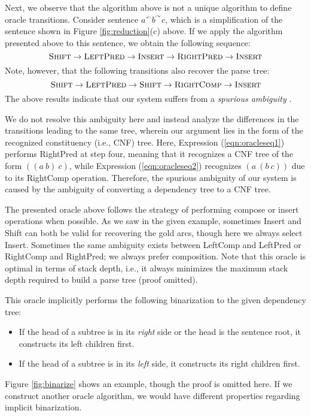 \documentclass[english]{jnlp_1.4}
\begin{document}
Next, we observe that the algorithm above is not a unique algorithm to define oracle transitions.
Consider sentence $a ^\curvearrowleft b ^\curvearrowright c$, 
    which is a simplification of the sentence shown in Figure \ref{fig:reduction}(c) above.
If we apply the algorithm presented above to this sentence, we obtain the following sequence:
\begin{equation}
 \textsc{Shift} \rightarrow \textsc{LeftPred} \rightarrow \textsc{Insert} \rightarrow \textsc{RightPred} \rightarrow \textsc{Insert} \label{eqn:oracleseq1}
\end{equation}
Note, however, that the following transitions also recover the parse tree:
\begin{equation}
 \textsc{Shift} \rightarrow \textsc{LeftPred} \rightarrow \textsc{Shift} \rightarrow \textsc{RightComp} \rightarrow \textsc{Insert} \label{eqn:oracleseq2}
\end{equation}
The above results indicate that our system suffers from a {\it spurious ambiguity} \cite{GoldbergTDP13}.

We do not resolve this ambiguity here and instead analyze the differences in the transitions leading to the same tree, wherein our argument lies in the form of the recognized constituency (i.e., CNF) tree.
Here, Expression (\ref{eqn:oracleseq1}) performs {\sc RightPred} at step four, meaning that it recognizes a CNF tree of the form $((a~b)~c)$, while Expression (\ref{eqn:oracleseq2}) recognizes $(a~(b~c))$ due to its {\sc RightComp} operation. Therefore, the spurious ambiguity of our system is caused by the ambiguity of converting a dependency tree to a CNF tree.

The presented oracle above follows the strategy of performing compose or insert operations when possible.
As we saw in the given example, sometimes {\sc Insert} and {\sc Shift} can both be valid for recovering the gold arcs, though here we always select {\sc Insert}.
Sometimes the same ambiguity exists between {\sc LeftComp} and {\sc LeftPred} or {\sc RightComp} and {\sc RightPred};
we always prefer composition.
Note that this oracle is optimal in terms of stack depth, i.e., it always minimizes the maximum stack depth required to build a parse tree (proof omitted).

This oracle implicitly performs the following binarization to the given dependency tree:
\begin{itemize}
 \item If the head of a subtree is in its {\it right} side or the head is the sentence root, it constructs its left children first.
 \item If the head of a subtree is in its {\it left} side, it constructs its right children first.
\end{itemize}
Figure \ref{fig:binarize} shows an example, though the proof is omitted here.
If we construct another oracle algorithm, we would have different properties regarding implicit binarization.
\end{document}
